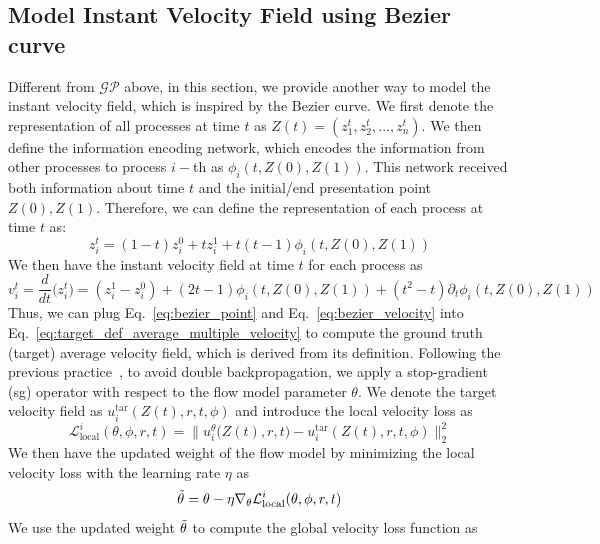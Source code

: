 \documentclass{article}
\begin{document}
\subsection{Model Instant Velocity Field using Bezier curve}
Different from $\mathcal{GP}$ above, in this section, we provide another way to model the instant velocity field, which is inspired by the Bezier curve. We first denote the representation of all processes at time $t$ as $Z(t) = (z^t_1, z^t_2, ...,z^t_n )$. We then define the information encoding network, which encodes the information from other processes to process $i-$th as $\phi_i(t, Z(0), Z(1))$. This network received both information about time $t$ and the initial/end presentation point $Z(0), Z(1)$. Therefore, we can define the representation of each process at time $t$ as: 
\begin{equation}
    z^t_i = (1-t) z_i^0 + tz^1_i + t(t-1)\phi_i(t, Z(0), Z(1)) \label{eq:bezier_point}
\end{equation}
We then have the instant velocity field at time $t$ for each process as 
\begin{equation}
    v^t_i = \frac{d}{dt} \Big(z^t_i \Big) = (z^1_i - z^0_i) + (2t -1) \phi_i(t,Z(0),Z(1)) + (t^2 - t) \partial_t \phi_i(t, Z(0), Z(1)) \label{eq:bezier_velocity}
\end{equation}
Thus, we can plug Eq.~\ref{eq:bezier_point} and Eq.~\ref{eq:bezier_velocity} into Eq.~\ref{eq:target_def_average_multiple_velocity} to compute the ground truth (target) average velocity field, which is derived from its definition. Following the previous practice~\cite{geng2025mean}, to avoid double backpropagation, we apply a stop-gradient (sg) operator with respect to the flow model parameter $\theta$. We denote the target velocity field as $u^{\text{tar}}_i(Z(t), r, t, \phi)$ and introduce the local velocity loss as 
\begin{equation}
    \mathcal{L}^{i}_{\text{local}}(\theta, \phi, r, t) = \|u^{\theta}_i\big(Z(t), r,t\big) - u_i^{\text{tar}}(Z(t), r, t, \phi) \|^2_2 \label{eq:local_loss_bezier}
\end{equation}
We then have the updated weight of the flow model by minimizing the local velocity loss with the learning rate $\eta$ as 
\begin{equation}
    \Tilde{\theta} = \theta - \eta \nabla_{\theta} \mathcal{L}^{i}_{\text{local}}(\theta, \phi, r,t) \label{eq:update_flow_weight_bezier}
\end{equation}
We use the updated weight $\Tilde{\theta}$ to compute the global velocity loss function as 
\end{document}
